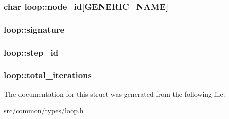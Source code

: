 \subsubsection[{\texorpdfstring{node\+\_\+id}{node_id}}]{\setlength{\rightskip}{0pt plus 5cm}char loop\+::node\+\_\+id\mbox{[}{\bf G\+E\+N\+E\+R\+I\+C\+\_\+\+N\+A\+ME}\mbox{]}}\hypertarget{structloop_a8dc54b761e65cb2099c82172bbe34111}{}\label{structloop_a8dc54b761e65cb2099c82172bbe34111}
\subsubsection[{\texorpdfstring{signature}{signature}}]{ loop\+::signature}\hypertarget{structloop_a05119bc29e5aeea874b779eae1a9c1a5}{}\label{structloop_a05119bc29e5aeea874b779eae1a9c1a5}
\subsubsection[{\texorpdfstring{step\+\_\+id}{step_id}}]{ loop\+::step\+\_\+id}\hypertarget{structloop_a401564bb9ea5a527ed87afaaef275076}{}\label{structloop_a401564bb9ea5a527ed87afaaef275076}
\subsubsection[{\texorpdfstring{total\+\_\+iterations}{total_iterations}}]{ loop\+::total\+\_\+iterations}\hypertarget{structloop_a330a0dd141e72128f60395a832a289eb}{}\label{structloop_a330a0dd141e72128f60395a832a289eb}


The documentation for this struct was generated from the following file\+:\begin{DoxyCompactItemize}
\item 
src/common/types/\hyperlink{loop_8h}{loop.\+h}\end{DoxyCompactItemize}
